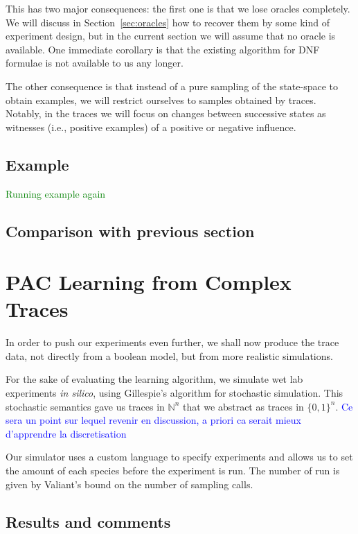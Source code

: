 \documentclass{llncs}
\newcommand{\francois}[1]{\textcolor{blue}{#1}}
\newcommand{\sylvain}[1]{\textcolor{green}{#1}}
\begin{document}
This has two major consequences: the first one is that we lose oracles
completely. We will discuss in Section~\ref{sec:oracles} how to recover them
by some kind of experiment design, but in the current section we will assume
that no oracle is available. One immediate corollary is that the existing
algorithm for DNF formulae is not available to us any longer.

The other consequence is that instead of a pure sampling of the state-space to
obtain examples, we will restrict ourselves to samples obtained by traces.
Notably, in the traces we will focus on changes between successive states as
witnesses (i.e., positive examples) of a positive or negative influence.

\subsection{Example}

\sylvain{Running example again}

\subsection{Comparison with previous section}

\section{PAC Learning from Complex Traces}

In order to push our experiments even further, we shall now produce the trace
data, not directly from a boolean model, but from more realistic simulations.

For the sake of evaluating the learning algorithm,
we simulate wet lab experiments \emph{in silico}, using Gillespie's algorithm for stochastic simulation.
This stochastic semantics gave us traces in ${\mathbb{N}}^n$ that we abstract as traces in ${\{0,1\}}^n$.
\francois{Ce sera un point sur lequel revenir en discussion, a priori ca serait mieux d'apprendre la discretisation}

Our simulator uses a custom language to specify experiments and allows us to set the amount of each species before the experiment is run. The number of run is given by Valiant's bound on the number of sampling calls.


\subsection{Results and comments}
\end{document}
